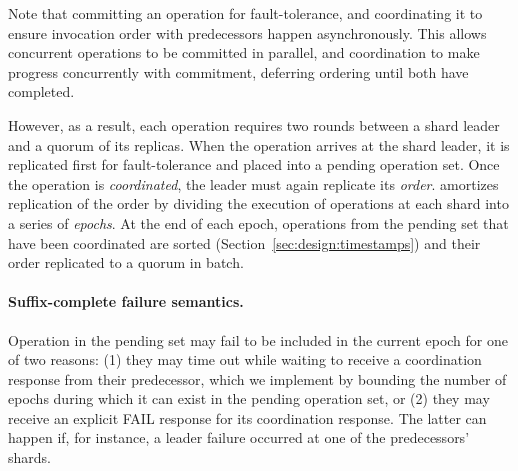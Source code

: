

Note that committing an operation for fault-tolerance, and coordinating it to
ensure invocation order with predecessors happen asynchronously. This allows
concurrent operations to be committed in parallel, and coordination to make
progress concurrently with commitment, deferring ordering until both have
completed.


However, as a result, each operation requires two rounds between a shard leader
and a quorum of its replicas. When the operation arrives at the shard leader, it
is replicated first for fault-tolerance and placed into a pending operation set.
Once the operation is \textit{coordinated}, the leader must again replicate its
\emph{order}. \sys{} amortizes replication of the order by dividing the
execution of operations at each shard into a series of \textit{epochs}. At the
end of each epoch, operations from the pending set that have been coordinated
are sorted (Section~\ref{sec:design:timestamps}) and their order replicated to a
quorum in batch.





\paragraph{Suffix-complete failure semantics.}

Operation in the pending set may fail to be included in the current epoch for
one of two reasons: (1) they may time out while waiting to receive a
coordination response from their predecessor, which we implement by bounding the
number of epochs during which it can exist in the pending operation set, or (2)
they may receive an explicit FAIL response for its coordination response. The
latter can happen if, for instance, a leader failure occurred at one of the
predecessors' shards.

